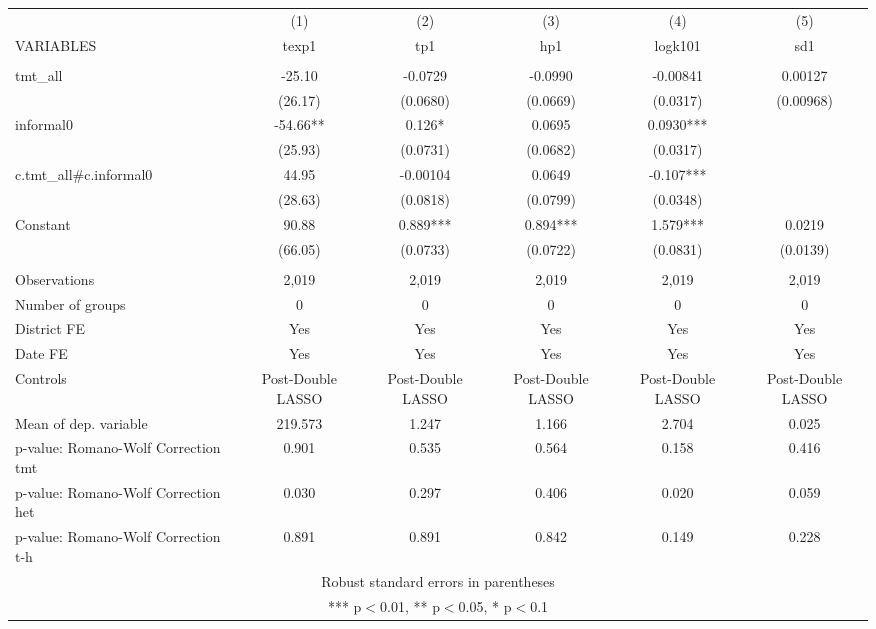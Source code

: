 \documentclass[]{article}
\begin{document}
\begin{tabular}{lccccc} \hline
 & (1) & (2) & (3) & (4) & (5) \\
VARIABLES & texp1 & tp1 & hp1 & logk101 & sd1 \\ \hline
 &  &  &  &  &  \\
tmt\_all & -25.10 & -0.0729 & -0.0990 & -0.00841 & 0.00127 \\
 & (26.17) & (0.0680) & (0.0669) & (0.0317) & (0.00968) \\
informal0 & -54.66** & 0.126* & 0.0695 & 0.0930*** &  \\
 & (25.93) & (0.0731) & (0.0682) & (0.0317) &  \\
c.tmt\_all\#c.informal0 & 44.95 & -0.00104 & 0.0649 & -0.107*** &  \\
 & (28.63) & (0.0818) & (0.0799) & (0.0348) &  \\
Constant & 90.88 & 0.889*** & 0.894*** & 1.579*** & 0.0219 \\
 & (66.05) & (0.0733) & (0.0722) & (0.0831) & (0.0139) \\
 &  &  &  &  &  \\
Observations & 2,019 & 2,019 & 2,019 & 2,019 & 2,019 \\
Number of groups & 0 & 0 & 0 & 0 & 0 \\
District FE & Yes & Yes & Yes & Yes & Yes \\
Date FE & Yes & Yes & Yes & Yes & Yes \\
Controls & Post-Double LASSO & Post-Double LASSO & Post-Double LASSO & Post-Double LASSO & Post-Double LASSO \\
Mean of dep. variable & 219.573 & 1.247 & 1.166 & 2.704 & 0.025 \\
p-value: Romano-Wolf Correction tmt & 0.901 & 0.535 & 0.564 & 0.158 & 0.416 \\
p-value: Romano-Wolf Correction het & 0.030 & 0.297 & 0.406 & 0.020 & 0.059 \\
 p-value: Romano-Wolf Correction t-h & 0.891 & 0.891 & 0.842 & 0.149 & 0.228 \\ \hline
\multicolumn{6}{c}{ Robust standard errors in parentheses} \\
\multicolumn{6}{c}{ *** p$<$0.01, ** p$<$0.05, * p$<$0.1} \\
\end{tabular}
\end{document}
